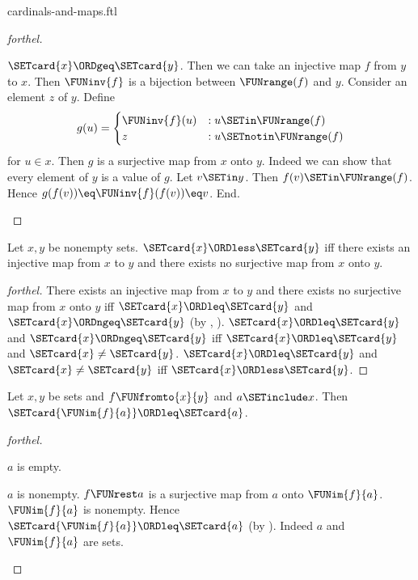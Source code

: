 \documentclass{naproche-library}
\begin{document}
\begin{smodule}[title=Cardinal Numbers and Maps]{cardinals-and-maps.ftl}
\begin{proof}[forthel]
  \begin{case}{$\SETcard{x} \ORDgeq \SETcard{y}$.}
    Then we can take an injective map $f$ from $y$ to $x$.
    Then $\FUNinv{f}$ is a bijection between $\FUNrange(f)$ and $y$.
    Consider an element $z$ of $y$.
    Define \[ g(u) =
      \begin{cases}
        \FUNinv{f}(u) & : u \SETin \FUNrange(f) \\
        z         & : u \SETnotin \FUNrange(f)
      \end{cases} \]
    for $u \in x$.
    Then $g$ is a surjective map from $x$ onto $y$.
    Indeed we can show that every element of $y$ is a value of $g$.
      Let $v \SETin y$.
      Then $f(v) \SETin \FUNrange(f)$.
      Hence $g(f(v)) \eq \FUNinv{f}(f(v)) \eq v$.
    End.
  \end{case}
\end{proof}

\begin{proposition}[forthel,id=SET_THEORY_06_5843717288099840]
  Let $x, y$ be nonempty sets.
  $\SETcard{x} \ORDless \SETcard{y}$ iff there exists an injective map from $x$ to $y$ and there exists no surjective map from $x$ onto $y$.
\end{proposition}
\begin{proof}[forthel]
  There exists an injective map from $x$ to $y$ and there exists no surjective map from $x$ onto $y$ iff $\SETcard{x} \ORDleq \SETcard{y}$ and $\SETcard{x} \ORDngeq \SETcard{y}$ (by , ).
  $\SETcard{x} \ORDleq \SETcard{y}$ and $\SETcard{x} \ORDngeq \SETcard{y}$ iff $\SETcard{x} \ORDleq \SETcard{y}$ and $\SETcard{x} \neq \SETcard{y}$.
  $\SETcard{x} \ORDleq \SETcard{y}$ and $\SETcard{x} \neq \SETcard{y}$ iff $\SETcard{x} \ORDless \SETcard{y}$.
\end{proof}

\begin{proposition}[forthel,id=SET_THEORY_06_8113916590686208]
  Let $x, y$ be sets and $f \FUNfromto{x}{y}$ and $a \SETinclude x$.
  Then $\SETcard{\FUNim{f}{a}} \ORDleq \SETcard{a}$.
\end{proposition}
\begin{proof}[forthel]
  \begin{case}{$a$ is empty.} \end{case}

  \begin{case}{$a$ is nonempty.}
    $f \FUNrest a$ is a surjective map from $a$ onto $\FUNim{f}{a}$.
    $\FUNim{f}{a}$ is nonempty.
    Hence $\SETcard{\FUNim{f}{a}} \ORDleq \SETcard{a}$ (by ).
    Indeed $a$ and $\FUNim{f}{a}$ are sets.
  \end{case}
\end{proof}
\end{smodule}
\end{document}
